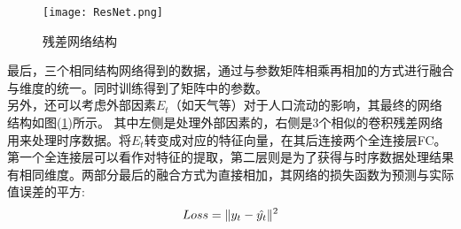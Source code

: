 \begin{figure}[ht]
\centering
\texttt{[image: ResNet.png]}
\caption{残差网络结构}
\label{fig:2.6}
\end{figure}
最后，三个相同结构网络得到的数据，通过与参数矩阵相乘再相加的方式进行融合与维度的统一。同时训练得到了矩阵中的参数。
\\
\indent 另外，还可以考虑外部因素$E_t$（如天气等）对于人口流动的影响，其最终的网络结构如图(\ref{fig:2.6})所示。
其中左侧是处理外部因素的，右侧是3个相似的卷积残差网络用来处理时序数据。将$E_t$转变成对应的特征向量，在其后连接两个全连接层FC。第一个全连接层可以看作对特征的提取，第二层则是为了获得与时序数据处理结果有相同维度。两部分最后的融合方式为直接相加，其网络的损失函数为预测与实际值误差的平方:
\begin{equation}
Loss = \Arrowvert y_t - \hat{y_t} \Arrowvert^2
\end{equation}
